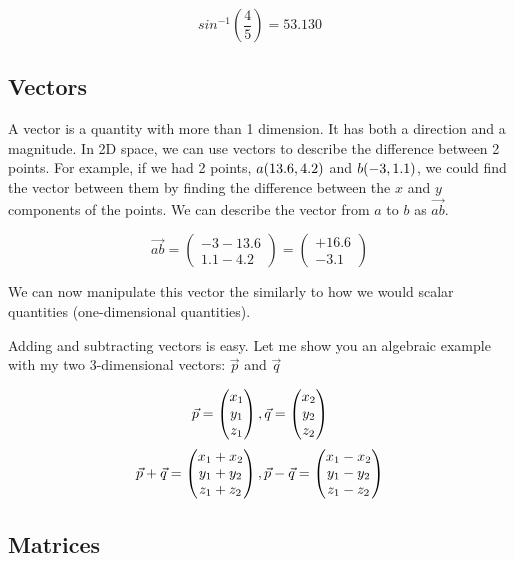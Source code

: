 \[sin^{-1}\left(\frac{4}{5}\right)=53.130\]

\hypertarget{vectors}{%
\subsection{Vectors}\label{vectors}}

A vector is a quantity with more than 1 dimension. It has both a direction and a magnitude. In 2D space, we can use vectors to describe the difference between 2 points. For example, if we had 2 points, \(a(13.6,\space4.2)\) and \(b(-3,\space1.1)\), we could find the vector between them by finding the difference between the \(x\) and \(y\) components of the points. We can describe the vector from \(a\) to \(b\) as \(\vec{ab}\).

\[\vec{ab}=\begin{pmatrix}
-3-13.6\\1.1-4.2
\end{pmatrix}=
\begin{pmatrix}
+16.6\\-3.1
\end{pmatrix}\]

We can now manipulate this vector the similarly to how we would scalar quantities (one-dimensional quantities).

Adding and subtracting vectors is easy. Let me show you an algebraic example with my two 3-dimensional vectors: \(\vec{p}\) and \(\vec{q}\)

\[
\vec{p}=\begin{pmatrix}
x_{1}\\y_{1}\\z_{1}
\end{pmatrix},\space
\vec{q}=\begin{pmatrix}
x_{2}\\y_{2}\\z_{2}
\end{pmatrix}
\] \[
\vec{p}+\vec{q}=\begin{pmatrix}
x_{1}+x_{2}\\y_{1}+y_{2}\\z_{1}+z_{2}
\end{pmatrix},\space\vec{p}-\vec{q}=\begin{pmatrix}
x_{1}-x_{2}\\y_{1}-y_{2}\\z_{1}-z_{2}
\end{pmatrix}
\]

\hypertarget{matrices}{%
\subsection{Matrices}\label{matrices}}


